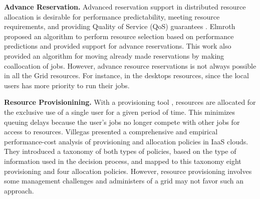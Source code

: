 


\textbf{Advance Reservation.} Advanced reservation support in distributed resource allocation is desirable for performance predictability, meeting resource requirements, and providing Quality of Service (QoS) guarantees \cite{Castillo2008, Foster1999, Mcgough2005, Meinl2008}.  Elmroth \cite{Elmroth2009} proposed an algorithm to perform resource selection based on performance predictions and provided support for advance reservations. This work also provided an algorithm for moving already made reservations by making coallocation of jobs. However, advance resource reservations is not always possible in all the Grid resources. For instance, in the desktops resources, since the local users has more priority to run their jobs.

\textbf{Resource Provisionining.} With a provisioning tool \cite{Juve2010a}, resources are allocated for the exclusive use of a single user for a given period of time. This minimizes queuing delays because the user’s jobs no longer compete with other jobs for access to resources. 
Villegas \cite{Villegas2012} presented a comprehensive and empirical performance-cost analysis of provisioning and allocation policies in IaaS clouds. They introduced a taxonomy of both types of policies, based on the type of information used in the decision process, and mapped to this taxonomy eight provisioning and four allocation policies. However, resource provisioning involves some management challenges and administers of a grid may not favor such an approach. 

